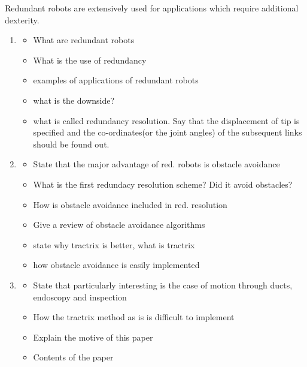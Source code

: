 \documentclass[12pt,a4]{article}
\begin{document}
Redundant robots are extensively used for applications which require additional dexterity. 


\begin{enumerate}
\item
\begin{itemize}
\item What are redundant robots
\item What is the use of redundancy
\item examples of applications of redundant robots
\item what is the downside?
\item what is called redundancy resolution. Say that the displacement of tip is specified and the co-ordinates(or the joint angles) of the subsequent links should be found out.
\end{itemize}

\item
\begin{itemize}
\item State that the major advantage of red. robots is obstacle avoidance
\item What is the first redundacy resolution scheme? Did it avoid obstacles?
\item How is obstacle avoidance included in red. resolution
\item Give a review of obstacle avoidance algorithms
\item state why tractrix is better, what is tractrix
\item how obstacle avoidance is easily implemented
\end{itemize}

\item
\begin{itemize}
\item State that particularly interesting is the case of motion through ducts, endoscopy and inspection
\item How the tractrix method as is is difficult to implement
\item Explain the motive of this paper
\item Contents of the paper
\end{itemize}
\end{enumerate}
\end{document}
